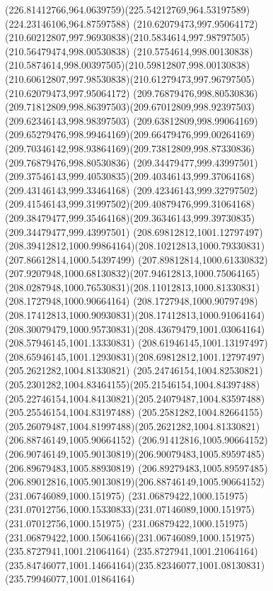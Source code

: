 {{  \curveto(226.81412766,964.0639759)(225.54212769,964.53197589)(224.23146106,964.87597588)
  \moveto(210.62079473,997.95064172)
  \curveto(210.60212807,997.96930838)(210.5834614,997.98797505)(210.56479474,998.00530838)
  \curveto(210.5754614,998.00130838)(210.5874614,998.00397505)(210.59812807,998.00130838)
  \curveto(210.60612807,997.98530838)(210.61279473,997.96797505)(210.62079473,997.95064172)
  \moveto(209.76879476,998.80530836)
  \curveto(209.71812809,998.86397503)(209.67012809,998.92397503)(209.62346143,998.98397503)
  \curveto(209.63812809,998.99064169)(209.65279476,998.99464169)(209.66479476,999.00264169)
  \curveto(209.70346142,998.93864169)(209.73812809,998.87330836)(209.76879476,998.80530836)
  \moveto(209.34479477,999.43997501)
  \curveto(209.37546143,999.40530835)(209.40346143,999.37064168)(209.43146143,999.33464168)
  \curveto(209.42346143,999.32797502)(209.41546143,999.31997502)(209.40879476,999.31064168)
  \curveto(209.38479477,999.35464168)(209.36346143,999.39730835)(209.34479477,999.43997501)
  \moveto(208.69812812,1001.12797497)
  \curveto(208.39412812,1000.99864164)(208.10212813,1000.79330831)(207.86612814,1000.54397499)
  \curveto(207.89812814,1000.61330832)(207.9207948,1000.68130832)(207.94612813,1000.75064165)
  \curveto(208.0287948,1000.76530831)(208.11012813,1000.81330831)(208.1727948,1000.90664164)
  \curveto(208.1727948,1000.90797498)(208.17412813,1000.90930831)(208.17412813,1000.91064164)
  \curveto(208.30079479,1000.95730831)(208.43679479,1001.03064164)(208.57946145,1001.13330831)
  \curveto(208.61946145,1001.13197497)(208.65946145,1001.12930831)(208.69812812,1001.12797497)
  \moveto(205.2621282,1004.81330821)
  \curveto(205.24746154,1004.82530821)(205.2301282,1004.83464155)(205.21546154,1004.84397488)
  \curveto(205.22746154,1004.84130821)(205.24079487,1004.83597488)(205.25546154,1004.83197488)
  \curveto(205.2581282,1004.82664155)(205.26079487,1004.81997488)(205.2621282,1004.81330821)
  \moveto(206.88746149,1005.90664152)
  \lineto(206.91412816,1005.90664152)
  \curveto(206.90746149,1005.90130819)(206.90079483,1005.89597485)(206.89679483,1005.88930819)
  \curveto(206.89279483,1005.89597485)(206.89012816,1005.90130819)(206.88746149,1005.90664152)
  \moveto(231.06746089,1000.151975)
  \curveto(231.06879422,1000.151975)(231.07012756,1000.15330833)(231.07146089,1000.151975)
  \lineto(231.07012756,1000.151975)
  \curveto(231.06879422,1000.151975)(231.06879422,1000.15064166)(231.06746089,1000.151975)
  \moveto(235.8727941,1001.21064164)
  \lineto(235.8727941,1001.21064164)
  \curveto(235.84746077,1001.14664164)(235.82346077,1001.08130831)(235.79946077,1001.01864164)
}}
